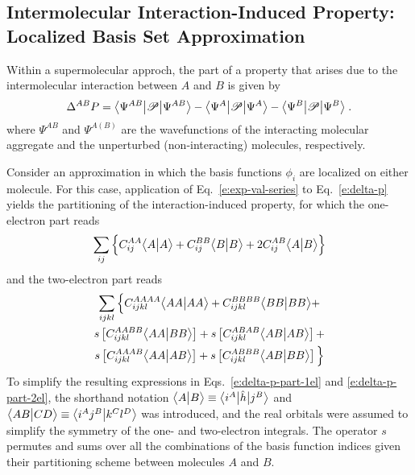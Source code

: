 
\subsection{\label{ss:2.1}Intermolecular Interaction-Induced Property: Localized Basis Set Approximation}

Within a supermolecular approch, the part of a property that arises due to the
intermolecular interaction between $A$ and $B$ is given by
%
\begin{equation} \label{e:delta-p}
	\Delta^{AB} P = \bigl\langle {\Psi^{AB}} \bigl\lvert {\mathscr{P}} \bigl\lvert {\Psi^{AB}} \bigr\rangle - 
	    \bigl\langle {\Psi^{A}} \bigl\lvert {\mathscr{P}} \bigl\lvert {\Psi^{A}} \bigr\rangle -
	    \bigl\langle {\Psi^{B}} \bigl\lvert {\mathscr{P}} \bigl\lvert {\Psi^{B}} \bigr\rangle\;.
\end{equation}
%
where $\Psi^{AB}$ and $\Psi^{A(B)}$ are the wavefunctions of the interacting molecular aggregate
and the unperturbed (non\hyp{}interacting) molecules, respectively.

Consider an approximation in which the basis functions $\phi_i$ 
are localized on either molecule. 
For this case, application of Eq.~\eqref{e:exp-val-series}
to Eq.~\eqref{e:delta-p} yields the partitioning of the interaction\hyp{}induced property,
for which the one\hyp{}electron part reads
%
\begin{equation} \label{e:delta-p-part-1el}
	\sum_{ij} \Big\{ 
	C^{AA}_{ij}  \BraKet{A}{A} + %
	C^{BB}_{ij}  \BraKet{B}{B} + %
2	C^{AB}_{ij}  \BraKet{A}{B}   %
	\Big\}
\end{equation}
%
and the two\hyp{}electron part reads
%
\begin{multline} \label{e:delta-p-part-2el}
	\sum_{ijkl} \Big\{  
	C^{AAAA}_{ijkl} \BraKet{AA}{AA} +    %
	C^{BBBB}_{ijkl} \BraKet{BB}{BB} + \\ %
	{s} \left[ C^{AABB}_{ijkl} \BraKet{AA}{BB} \right] + 
	{s} \left[ C^{ABAB}_{ijkl} \BraKet{AB}{AB} \right] + \\
	{s} \left[ C^{AAAB}_{ijkl} \BraKet{AA}{AB} \right] +
	{s} \left[ C^{ABBB}_{ijkl} \BraKet{AB}{BB} \right]
	\Big\}
\end{multline}
%
To simplify the resulting expressions
in Eqs.~\eqref{e:delta-p-part-1el} and \eqref{e:delta-p-part-2el},
the shorthand notation $\bigl\langle {A} \bigl\lvert {B} \bigr\rangle \equiv \bigl\langle {i^A} \bigl\lvert {\hat{h}} \bigl\lvert {j^B} \bigr\rangle$ and 
$\bigl\langle {AB} \bigl\lvert {CD} \bigr\rangle \equiv \bigl\langle {i^Aj^B} \bigl\lvert {k^Cl^D} \bigr\rangle$
was introduced, and
the real orbitals 
were assumed to simplify the symmetry of the one\hyp{} and two\hyp{}electron integrals.
The operator $s$ permutes and sums over all the combinations of the basis function indices
given their partitioning scheme between molecules $A$ and $B$.

